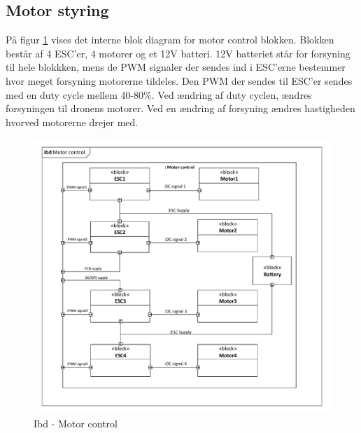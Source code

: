 \subsection{Motor styring}

På figur \ref{fig:ibd_motorcontrol} vises det interne blok diagram for motor control blokken. Blokken består af 4 ESC'er, 4 motorer og et 12V batteri. 12V batteriet står for forsyning til hele blokkken, mens de PWM signaler der sendes ind i ESC'erne bestemmer hvor meget forsyning motorerne tildeles. Den PWM der sendes til ESC'er sendes med en duty cycle mellem 40-80\%. Ved ændring af duty cyclen, ændres forsyningen til dronens motorer. Ved en ændring af forsyning ændres hastigheden hvorved motorerne drejer  med.

\begin{figure}[H]
\centering
\includegraphics[width=1\textwidth]{Billeder/IBD/ibd6_motorcontrol.pdf}
\vspace{-1cm}
\caption{Ibd - Motor control}
\label{fig:ibd_motorcontrol}
\end{figure}

